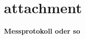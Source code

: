 \documentclass[	%
		11pt,a4paper,	%
		twoside,		%
		english,		%
		f1				%
	]{HsH-report}		%
\begin{document}
\chapter{attachment}
\textbf{\Large{Messprotokoll oder so}} %

\printbibliography
\noindent\begin{minipage}{\textwidth} %
	\listoffigures
	\listoftables
\end{minipage}
\end{document}
